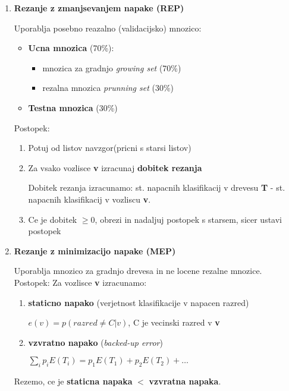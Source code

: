 \documentclass{article}
\begin{document}
\begin{multicols}{2}
	\begin{enumerate}
		\item \textbf{Rezanje z zmanjsevanjem napake (REP)}

		      Uporablja posebno reazalno (validacijsko) mnozico:
		      \begin{itemize}
			      \item \textbf{Ucna mnozica} (70\%):
			            \begin{itemize}
				            \item mnozica za gradnjo \textit{growing set} (70\%)
				            \item rezalna mnozica \textit{prunning set} (30\%)
			            \end{itemize}
			      \item \textbf{Testna mnozica} (30\%)
		      \end{itemize}
		      Postopek:
		      \begin{enumerate}
			      \item Potuj od listov navzgor(pricni s starsi listov)
			      \item Za vsako vozlisce \textbf{v} izracunaj \textbf{dobitek rezanja}

			            Dobitek rezanja izracunamo: st. napacnih klasifikacij v drevesu \textbf{T} - st. napacnih klasifikacij v vozliscu \textbf{v}.
			      \item Ce je dobitek $\geq 0$, obrezi in nadaljuj postopek s starsem, sicer ustavi postopek
		      \end{enumerate}
		\item \textbf{Rezanje z minimizacijo napake (MEP)}

		      Uporablja mnozico za gradnjo drevesa in ne locene rezalne mnozice.
		      Postopek: Za vozlisce \textbf{v} izracunamo:
		      \begin{enumerate}
			      \item \textbf{staticno napako} (verjetnost klasifikacije v napacen razred)
			            \begin{center}
				            \begin{math}
					            e(v) = p(razred \neq C | v)
				            \end{math},
				            C je vecinski razred v \textbf{v}
			            \end{center}
			      \item \textbf{vzvratno napako} (\textit{backed-up error})
			            \begin{center}
				            \begin{math}
					            \sum_i p_i E(T_i) = p_1 E(T_1) + p_2 E(T_2) + \dots
				            \end{math}
			            \end{center}
		      \end{enumerate}
		      Rezemo, ce je \textbf{staticna napaka} $<$ \textbf{vzvratna napaka}.


\end{enumerate}
\end{multicols}
\end{document}
